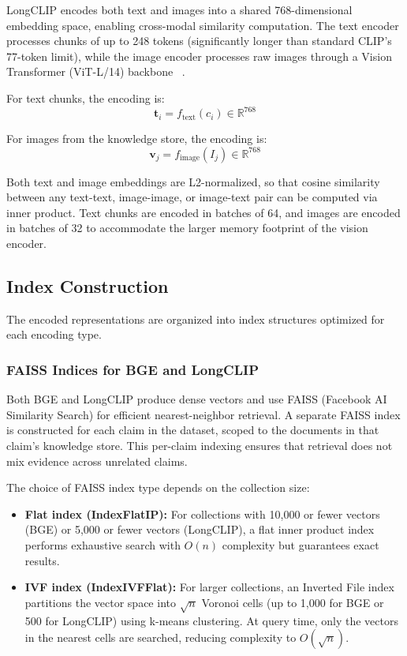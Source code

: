 LongCLIP encodes both text and images into a shared 768-dimensional embedding space, enabling cross-modal similarity computation. The text encoder processes chunks of up to 248 tokens (significantly longer than standard CLIP's 77-token limit), while the image encoder processes raw images through a Vision Transformer (ViT-L/14) backbone ~\cite{Zhang2024Mar}.

For text chunks, the encoding is:
\begin{equation}
    \mathbf{t}_i = f_{\text{text}}(c_i) \in \mathbb{R}^{768}
\end{equation}

For images from the knowledge store, the encoding is:
\begin{equation}
    \mathbf{v}_j = f_{\text{image}}(I_j) \in \mathbb{R}^{768}
\end{equation}

Both text and image embeddings are L2-normalized, so that cosine similarity between any text-text, image-image, or image-text pair can be computed via inner product. Text chunks are encoded in batches of 64, and images are encoded in batches of 32 to accommodate the larger memory footprint of the vision encoder.

\subsection{Index Construction}

The encoded representations are organized into index structures optimized for each encoding type.

\subsubsection{FAISS Indices for BGE and LongCLIP}

Both BGE and LongCLIP produce dense vectors and use FAISS (Facebook AI Similarity Search) for efficient nearest-neighbor retrieval. A separate FAISS index is constructed for each claim in the dataset, scoped to the documents in that claim's knowledge store. This per-claim indexing ensures that retrieval does not mix evidence across unrelated claims.

The choice of FAISS index type depends on the collection size:

\begin{itemize}
    \item \textbf{Flat index (IndexFlatIP):} For collections with 10,000 or fewer vectors (BGE) or 5,000 or fewer vectors (LongCLIP), a flat inner product index performs exhaustive search with $O(n)$ complexity but guarantees exact results.
    \item \textbf{IVF index (IndexIVFFlat):} For larger collections, an Inverted File index partitions the vector space into $\sqrt{n}$ Voronoi cells (up to 1,000 for BGE or 500 for LongCLIP) using k-means clustering. At query time, only the vectors in the nearest cells are searched, reducing complexity to $O(\sqrt{n})$.
\end{itemize}

